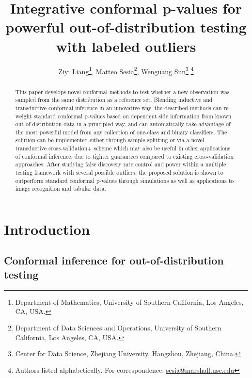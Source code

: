 \documentclass[11pt]{article}
\begin{document}
\title{Integrative conformal p-values for powerful out-of-distribution testing with labeled outliers}

\author{Ziyi Liang\thanks{Department of Mathematics, University of Southern California, Los Angeles, CA, USA.}, Matteo Sesia\thanks{Department of Data Sciences and Operations, University of Southern California, Los Angeles, CA, USA.}, Wenguang Sun\thanks{Center for Data Science, Zhejiang University, Hangzhou, Zhejiang, China.} \footnote{Authors listed alphabetically. For correspondence: \url{sesia@marshall.usc.edu}}}
\maketitle

\begin{abstract}
This paper develops novel conformal methods to test whether a new observation was sampled from the same distribution as a reference set. Blending inductive and transductive conformal inference in an innovative way, the described methods can re-weight standard conformal p-values based on dependent side information from known out-of-distribution data in a principled way, and can automatically take advantage of the most powerful model from any collection of one-class and binary classifiers. The solution can be implemented either through sample splitting or via a novel transductive cross-validation+ scheme which may also be useful in other applications of conformal inference, due to tighter guarantees compared to existing cross-validation approaches. After studying false discovery rate control and power within a multiple testing framework with several possible outliers, the proposed solution is shown to outperform standard conformal p-values through simulations as well as applications to image recognition and tabular data.
\end{abstract}

\section{Introduction}

\subsection{Conformal inference for out-of-distribution testing}
\end{document}
